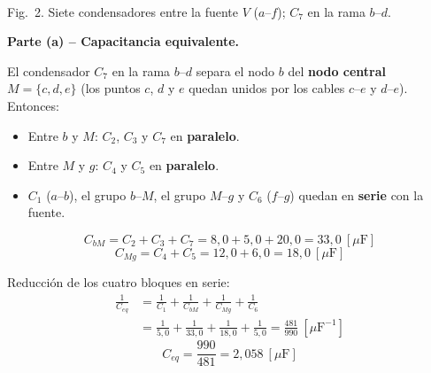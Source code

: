 \documentclass[12pt,letterpaper]{article}
\begin{document}
\begin{center}
\\[2pt]
{\footnotesize Fig.\ 2. Siete condensadores entre la fuente $V$ ($a$--$f$); $C_7$ en la rama $b$--$d$.}
\end{center}

\medskip
\noindent\textbf{Parte (a) -- Capacitancia equivalente.}

El condensador $C_7$ en la rama $b$--$d$ separa el nodo $b$ del \textbf{nodo central}
$M=\{c,d,e\}$ (los puntos $c$, $d$ y $e$ quedan unidos por los cables $c$--$e$ y $d$--$e$). Entonces:
\begin{itemize}
    \item Entre $b$ y $M$: $C_2$, $C_3$ y $C_7$ en \textbf{paralelo}.
    \item Entre $M$ y $g$: $C_4$ y $C_5$ en \textbf{paralelo}.
    \item $C_1$ ($a$--$b$), el grupo $b$--$M$, el grupo $M$--$g$ y $C_6$ ($f$--$g$) quedan en
          \textbf{serie} con la fuente.
\end{itemize}

\[
    C_{bM} = C_2 + C_3 + C_7 = 8{,}0 + 5{,}0 + 20{,}0 = 33{,}0\ [\mu\text{F}]
\]
\[
    C_{Mg} = C_4 + C_5 = 12{,}0 + 6{,}0 = 18{,}0\ [\mu\text{F}]
\]

Reducci\'on de los cuatro bloques en serie:
\begin{align*}
    \frac{1}{C_{eq}} &= \frac{1}{C_1} + \frac{1}{C_{bM}} + \frac{1}{C_{Mg}} + \frac{1}{C_6}\\[4pt]
                     &= \frac{1}{5{,}0} + \frac{1}{33{,}0} + \frac{1}{18{,}0} + \frac{1}{5{,}0}
                      = \frac{481}{990}\ [\mu\text{F}^{-1}]
\end{align*}
\[
    \boxed{C_{eq} = \frac{990}{481} = 2{,}058\ [\mu\text{F}]}
\]
\end{document}
